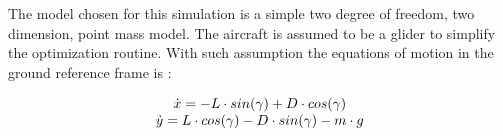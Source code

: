 

\par The model chosen for this simulation is a simple two degree of freedom, two dimension, point mass model. The aircraft is assumed to be a glider to simplify the optimization routine. With such assumption the equations of motion in the ground reference frame is :

\begin{equation}
	\begin{array}[c]{c}
		\dot{x}= -L \cdot sin(\gamma) + D \cdot cos(\gamma) \\ 
		\dot{y}= L \cdot cos(\gamma) - D \cdot sin(\gamma) - m \cdot g
	\end{array}
	\label{eqn:eqm}
\end{equation}








